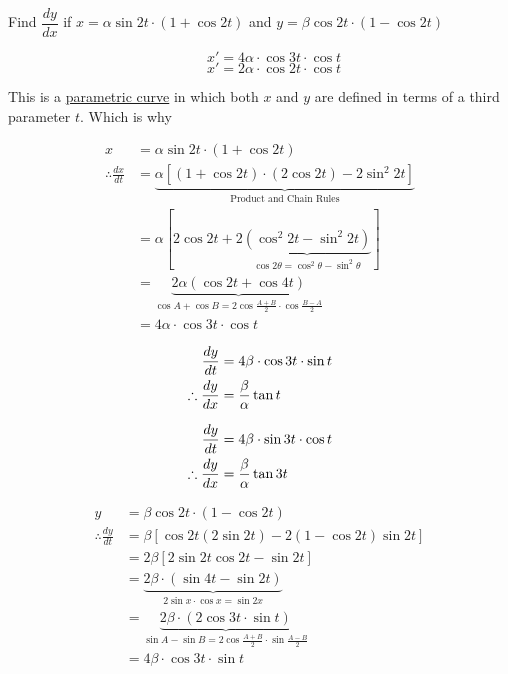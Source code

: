 \documentclass[14pt,fleqn]{extarticle}
\newcommand\fx{\alpha\sin 2t\cdot \left(1+\cos 2t \right)}
\newcommand\fy{\beta\cos 2t\cdot \left(1-\cos 2t \right)}
\begin{document}
\begin{problem}
	\statement 
    
     Find $\dfrac{dy}{dx}$ if $x = \fx$ and $y=\fy$       
     
   \begin{step}
  \begin{options} 
     \correct 
       \[ \qquad x' = 4\alpha\cdot\cos 3t\cdot \cos t \]
     \incorrect
        \[ \qquad x' = 2\alpha\cdot\cos 2t\cdot \cos t \]
    \end{options} 
     \reason 
     
     This is a \underline{parametric curve} in which both $x$ and $y$ are defined 
     in terms of a third parameter $t$. Which is why
     
     \begin{align}
	 x &= \fx \\
	 \therefore \frac{dx}{dt} &= \underbrace{\alpha \left[\left(1+\cos 2t \right)\cdot \left(2\cos 2t \right) - 2\sin^2 2t  \right]}_{\text{Product and Chain Rules}} \\
	 &= \alpha \left[2\cos 2t + 2 \underbrace{\left(\cos^2 2t - \sin^2 2t \right)}_{\cos 2\theta = \cos^2\theta - \sin^2\theta} \right] \\
	 &= \underbrace{2\alpha \left(\cos 2t + \cos 4t \right)}_{\cos A + \cos B = 2\cos \frac{A+B}{2}\cdot \cos\frac{B-A}{2}} \\
	 &= 4\alpha\cdot\cos 3t\cdot \cos t
\end{align}
       
\end{step}

\begin{step}
  \begin{options} 
     \correct 
       \begin{align}
	\frac{dy}{dt} &= 4\beta \cdot\cos 3t \cdot \sin t \\
	\therefore \frac{dy}{dx} &= \frac{\beta}{\alpha}\tan t
\end{align}
     \incorrect
        
        \begin{align}
	\frac{dy}{dt} &= 4\beta \cdot\sin 3t \cdot \cos t \\
	\therefore \frac{dy}{dx} &= \frac{\beta}{\alpha}\tan 3t
\end{align}

    \end{options} 
     \reason 
       
       \begin{align}
	y &= \fy \\
	\therefore \frac{dy}{dt} &= \beta \left[\cos 2t \left(2\sin 2t \right) - 2 \left(1-\cos 2t \right)\sin 2t \right] \\
	&= 2\beta \left[2\sin 2t\cos 2t - \sin 2t  \right] \\
	&= \underbrace{2\beta \cdot \left(\sin 4t - \sin 2t \right)}_{2\sin x\cdot\cos x = \sin 2x } \\
	&= \underbrace{2\beta\cdot \left(2\cos 3t\cdot\sin t \right)}_{\sin A - \sin B = 2\cos \frac{A+B}{2}\cdot \sin \frac{A-B}{2}} \\
	&= 4\beta \cdot\cos 3t \cdot \sin t 
\end{align}


\end{step}
\end{problem}
\end{document}
